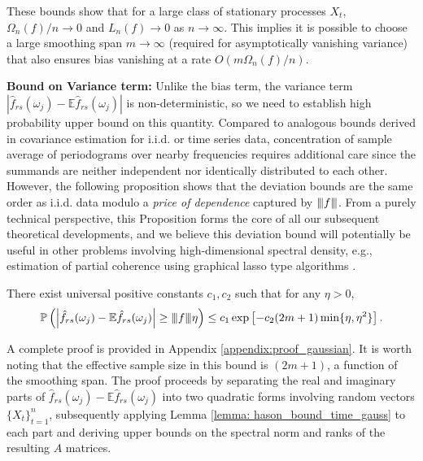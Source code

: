 \begin{remark}
These bounds show that for a large class of stationary processes $X_t$, $\Omega_n(f)/n \rightarrow 0$ and $L_n(f) \rightarrow 0$ as $n \rightarrow \infty$. This implies it is possible to choose a large smoothing span $m \rightarrow \infty$ (required for asymptotically vanishing variance) that also ensures bias vanishing at a rate $O(m \Omega_n(f)/n)$. \end{remark}

\noindent \textbf{Bound on Variance term:} Unlike the bias term, the variance term $|\hat{f}_{rs}(\omega_j) - \mathbb{E} \hat{f}_{rs} (\omega_j)|$ is non-deterministic, so we need to establish high probability upper bound on this quantity. Compared to analogous bounds derived in covariance estimation for i.i.d. \citep{bickel2008covariance} or time series \citep{shu2014estimation} data, concentration of sample average of periodograms over nearby frequencies requires additional care since the summands are neither independent nor identically distributed to each other. However, the following proposition shows that the deviation bounds are the same order as i.i.d. data modulo a \textit{price of dependence} captured by ${\left\vert\kern-0.25ex\left\vert\kern-0.25ex\left\vert f \right\vert\kern-0.25ex\right\vert\kern-0.25ex\right\vert}$. From a purely technical perspective, this Proposition forms the core of all our subsequent theoretical developments, and we believe this deviation bound will potentially be useful in other problems involving high-dimensional spectral density, e.g., estimation of partial coherence using graphical lasso type algorithms  \citep{jung2015graphical}. 
\begin{prop}
\label{prop:variance_bound}
There exist universal positive constants $c_1, c_2$ such that for any $\eta > 0$, 
\begin{equation}\label{eqn:conc-entrywise}
\mathbb{P}\left(\left|\hat{f}_{rs}(\omega_j) - \mathbb{E}\hat{f}_{rs}(\omega_j)\right| \ge {\left\vert\kern-0.25ex\left\vert\kern-0.25ex\left\vert f \right\vert\kern-0.25ex\right\vert\kern-0.25ex\right\vert}\eta\right)\le c_1\exp\left[-c_2(2m+1)\min\{\eta, \eta^2\}\right].
\end{equation} 
\end{prop}


A complete proof is provided in Appendix \ref{appendix:proof_gaussian}. It is worth noting that the effective sample size in this bound is $(2m+1)$, a function of the smoothing span. The proof proceeds by separating the real and imaginary parts of $\hat{f}_{rs}(\omega_j) - \mathbb{E}\hat{f}_{rs}(\omega_j)$ into two quadratic forms involving random vectors $\{X_t\}_{t=1}^n$, subsequently applying Lemma \ref{lemma: hason_bound_time_gauss} to each part and deriving upper bounds on the spectral norm and ranks of the resulting $A$ matrices. 


